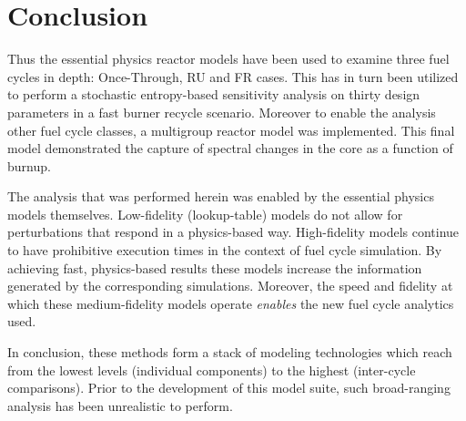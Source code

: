 \chapter{Conclusion}
%
\label{diss_conclusion}
Thus the essential physics reactor models have been used to examine three fuel cycles 
in depth: Once-Through, RU and FR cases.  This has in turn been utilized to perform 
a stochastic entropy-based sensitivity analysis on thirty design parameters in a fast
burner recycle scenario.  Moreover to enable the analysis other fuel cycle classes, 
a multigroup reactor model was implemented.  This final model demonstrated the capture 
of spectral changes in the core as a function of burnup.

The analysis that was performed herein was enabled by the essential physics models themselves.
Low-fidelity (lookup-table) models do not allow for perturbations that respond 
in a physics-based way.  High-fidelity models continue to have prohibitive execution times in the 
context of fuel cycle simulation.  By achieving fast, physics-based results these models increase 
the information generated by the corresponding simulations.
Moreover, the speed and fidelity at which these medium-fidelity models operate \emph{enables} the 
new fuel cycle analytics used.  

In conclusion, these methods form a stack of modeling technologies which reach from the lowest levels
(individual components) to the highest (inter-cycle comparisons).
Prior to the development of this model suite, such broad-ranging analysis has been unrealistic to perform.
